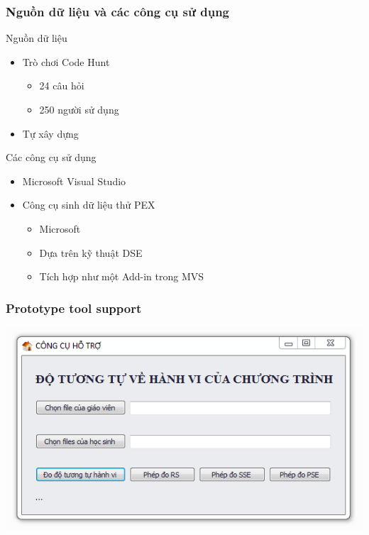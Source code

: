 \documentclass{beamer}
\begin{document}
\begin{frame}
  \frametitle{Nguồn dữ liệu và các công cụ sử dụng}
  \begin{block}{Nguồn dữ liệu}
    \begin{itemize}
    \item Trò chơi Code Hunt
      \begin{itemize}
      \item 24 câu hỏi
      \item 250 người sử dụng
      \end{itemize}
    \item Tự xây dựng
    \end{itemize}
  \end{block} \pause
  \begin{block}{Các công cụ sử dụng}
    \begin{itemize}
    \item Microsoft Visual Studio
    \item Công cụ sinh dữ liệu thử PEX
      \begin{itemize}
      \item Microsoft
      \item Dựa trên kỹ thuật DSE
      \item Tích hợp như một Add-in trong MVS
      \end{itemize}
    \end{itemize}
  \end{block}
\end{frame}

\begin{frame}
  \frametitle{Prototype tool support}
 
  \centering
  \includegraphics[width=\linewidth]{images/main.png}
  
\end{frame}
\end{document}

